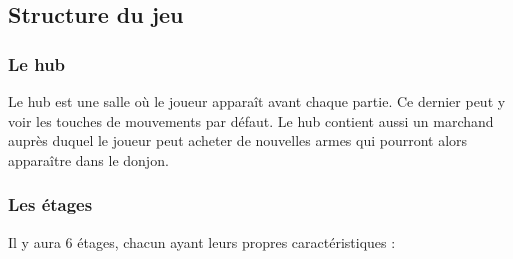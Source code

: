 \documentclass[]{extarticle}
\begin{document}
	\subsection{Structure du jeu}
		\subsubsection{Le hub}
\bigbreak
\bigbreak
Le hub est une salle où le joueur apparaît avant chaque partie. Ce dernier peut y voir les touches de mouvements par défaut. Le hub contient aussi un marchand auprès duquel le joueur peut acheter de nouvelles armes qui pourront alors apparaître dans le donjon.
\bigbreak

		\subsubsection{Les étages}
\bigbreak
\bigbreak
Il y aura 6 étages, chacun ayant leurs propres caractéristiques :
\bigbreak
\end{document}
